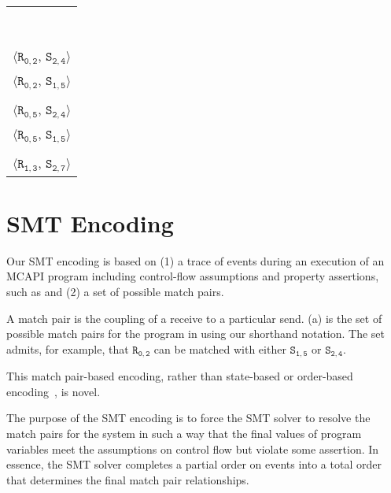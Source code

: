 \newsavebox{\boxMP}
\begin{lrbox}{\boxMP}
\normalsize
\begin{tabular}[t]{l}
\\\\\\\\\\\\\\\\\\
$\langle\mathtt{R_{0,2}}$, $\mathtt{S_{2,4}}\rangle$\\
$\langle\mathtt{R_{0,2}}$, $\mathtt{S_{1,5}}\rangle$\\
\\
$\langle\mathtt{R_{0,5}}$, $\mathtt{S_{2,4}}\rangle$\\
$\langle\mathtt{R_{0,5}}$, $\mathtt{S_{1,5}}\rangle$\\
\\
$\langle\mathtt{R_{1,3}}$, $\mathtt{S_{2,7}}\rangle$\\
\end{tabular}
\end{lrbox}

\section{SMT Encoding}\label{sec:smt}

Our SMT encoding is based on (1) a trace of events during an execution
of an MCAPI program including control-flow assumptions and property
assertions, such as  and (2) a set of possible
match pairs.

A match pair is the coupling of a receive to a particular
send. (a) is the set of possible match pairs for the
program in  using our shorthand notation. The set
admits, for example, that $\mathtt{R_{0,2}}$ can be matched with
either $\mathtt{S_{1,5}}$ or $\mathtt{S_{2,4}}$.

This match pair-based encoding, rather than state-based or order-based
encoding~\cite{elwakil:padtad10,elwakil:atva10}, is novel.

The purpose of the SMT encoding is to force the SMT solver to resolve
the match pairs for the system in such a way that the final values of
program variables meet the assumptions on control flow but violate
some assertion. In essence, the SMT solver completes a partial order
on events into a total order that determines the final match pair
relationships.

